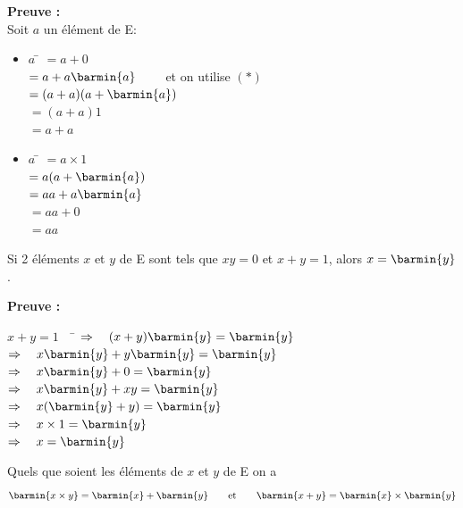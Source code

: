 \textbf{Preuve :}\\
Soit $a$ un élément de E:
\begin{multicols}{2}
    \begin{itemize}
        \item 	\begin{tabbing}
                  $a$ \= 	$=a+0$\\[.5em]
                  \>	$=a+a\barmin{a}\qquad$ et on utilise $(*)$\\[.5em]
                  \>	$=(a+a)(a+\barmin{a})$\\[.5em]
                  \>	$=(a+a)1$\\[.5em]
                  \>	$=a+a$
              \end{tabbing}
        \item 	\begin{tabbing}
                  $a$ \= $=a\times 1$\\[.5em]
                  \> $=a(a+\barmin{a})$\\[.5em]
                  \> $=aa+a\barmin{a}$\\[.5em]
                  \> $=aa+0$\\[.5em]
                  \> $=aa$
              \end{tabbing}
    \end{itemize}
\end{multicols}
\begin{propriete}
    Si 2 éléments $x$ et $y$ de E sont tels que $xy=0$ et $x+y=1$, alors $x=\barmin{y}$.
\end{propriete}
\textbf{Preuve :}
\begin{tabbing}
    $x+y=1\quad$	\=	$\Rightarrow\quad (x+y)\barmin{y}=\barmin{y}$\\[.5em]
    \>	$\Rightarrow\quad x\barmin{y}+y\barmin{y}=\barmin{y}$\\[.5em]
    \>	$\Rightarrow\quad x\barmin{y}+0=\barmin{y}$\\[.5em]
    \>	$\Rightarrow\quad x\barmin{y}+xy=\barmin{y}$\\[.5em]
    \>	$\Rightarrow\quad x(\barmin{y}+y)=\barmin{y}$\\[.5em]
    \>	$\Rightarrow\quad x\times 1=\barmin{y}$\\[.5em]
    \>	$\Rightarrow\quad x=\barmin{y}$
\end{tabbing}

\begin{propriete}
    Quels que soient les éléments de $x$ et $y$ de E on a $$\barmin{x\times y}=\barmin{x}+\barmin{y}  \qquad\textrm{et}\qquad \barmin{x+y}=\barmin{x}\times\barmin{y}$$
\end{propriete}


